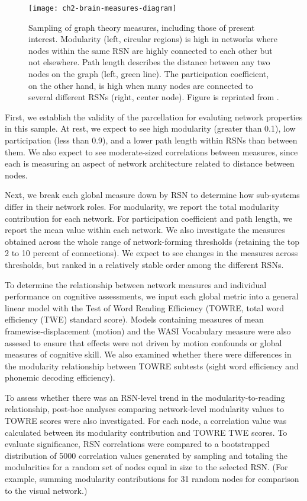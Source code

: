\begin{figure}[t]
    \centering
    \texttt{[image: ch2-brain-measures-diagram]}
    \caption[Sampling of graph theory measures]{Sampling of graph theory measures, including those of present interest. Modularity (left, circular regions) is high in networks where nodes within the same RSN are highly connected to each other but not elsewhere. Path length describes the distance between any two nodes on the graph (left, green line). The participation coefficient, on the other hand, is high when many nodes are connected to several different RSNs (right, center node). Figure is reprinted from \citep{Rubinov2010}.}
    \label{fig:ch2-brain-measures-diagram}
\end{figure}

First, we establish the validity of the parcellation for evaluting network properties in this sample. At rest, we expect to see high modularity (greater than 0.1), low participation (less than 0.9), and a lower path length within RSNs than between them. We also expect to see moderate-sized correlations between measures, since each is measuring an aspect of network architecture related to distance between nodes.  

Next, we break each global measure down by RSN to determine how sub-systems differ in their network roles. For modularity, we report the total modularity contribution for each network. For participation coefficient and path length, we report the mean value within each network. We also investigate the measures obtained across the whole range of network-forming thresholds (retaining the top 2 to 10 percent of connections). We expect to see changes in the measures across thresholds, but ranked in a relatively stable order among the different RSNs. 

To determine the relationship between network measures and individual performance on cognitive assessments, we input each global metric into a general linear model with the Test of Word Reading Efficiency (TOWRE, total word efficiency (TWE) standard score). Models containing measures of mean framewise-displacement (motion) and the WASI Vocabulary measure were also assesed to ensure that effects were not driven by motion confounds or global measures of cognitive skill. We also examined whether there were differences in the modularity relationship between TOWRE subtests (sight word efficiency  and phonemic decoding efficiency). 

To assess whether there was an RSN-level trend in the modularity-to-reading relationship, post-hoc analyses comparing network-level modularity values to TOWRE scores were also investigated. For each node, a correlation value was calculated between its modularity contribution and TOWRE TWE scores. To evaluate significance, RSN correlations were compared to a bootstrapped distribution of 5000 correlation values generated by sampling and totaling the modularities for a random set of nodes equal in size to the selected RSN. (For example, summing modularity contributions for 31 random nodes for comparison to the visual network.)


